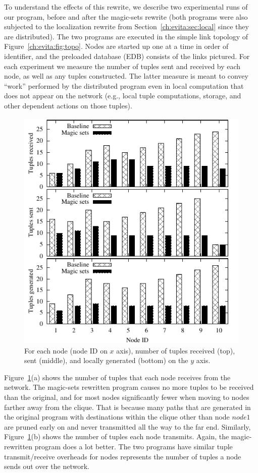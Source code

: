 To understand the effects of this rewrite, we describe two experimental runs of
our program, before and after the magic-sets rewrite (both programs were also
subjected to the localization rewrite from Section~\ref{ch:evita:sec:local}
since they are distributed).  The two programs are executed in the simple link
topology of Figure~\ref{ch:evita:fig:topo}.  Nodes are started up one at a time
in order of identifier, and the preloaded database (EDB) consists of the links
pictured.  For each experiment we measure the number of tuples sent and
received by each node, as well as any  tuples constructed.  The latter
measure is meant to convey ``work'' performed by the distributed program even
in local computation that does not appear on the network (e.g., local tuple
computations, storage, and other dependent actions on those tuples).

\begin{figure}
\centering
\includegraphics{figures/magicNumbers}
\ssp
\caption{For each node (node ID on $x$ axis), number of tuples received
  (top), sent (middle), and locally generated (bottom) on the $y$ axis.}
\label{ch:evita:fig:magicresults}
\end{figure}

Figure~\ref{ch:evita:fig:magicresults}(a) shows the number of tuples that each
node receives from the network.  The magic-sets rewritten program causes no
more tuples to be received than the original, and for most nodes significantly
fewer when moving to nodes farther away from the clique.  That is because many
paths that are generated in the original program with destinations within the
clique other than node $node1$ are pruned early on and never transmitted all the
way to the far end.  Similarly, Figure~\ref{ch:evita:fig:magicresults}(b) shows
the number of tuples each node transmits.  Again, the magic-rewritten program
does a lot better.  The two programs have similar tuple transmit/receive
overheads for nodes represents the number of tuples a node sends out over the
network.  

